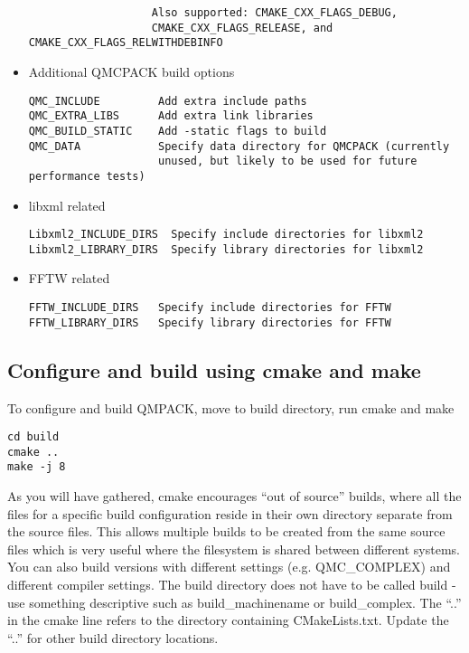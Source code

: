\begin{itemize}
\begin{verbatim}
                   Also supported: CMAKE_CXX_FLAGS_DEBUG,
                   CMAKE_CXX_FLAGS_RELEASE, and CMAKE_CXX_FLAGS_RELWITHDEBINFO
\end{verbatim}
\item Additional QMCPACK build options
\begin{verbatim}
QMC_INCLUDE         Add extra include paths
QMC_EXTRA_LIBS      Add extra link libraries
QMC_BUILD_STATIC    Add -static flags to build
QMC_DATA            Specify data directory for QMCPACK (currently
                    unused, but likely to be used for future performance tests)
\end{verbatim}
\item libxml related
\begin{verbatim}
Libxml2_INCLUDE_DIRS  Specify include directories for libxml2
Libxml2_LIBRARY_DIRS  Specify library directories for libxml2
\end{verbatim}
 \item FFTW related
\begin{verbatim}
FFTW_INCLUDE_DIRS   Specify include directories for FFTW
FFTW_LIBRARY_DIRS   Specify library directories for FFTW
\end{verbatim}
\end{itemize}

\subsection{Configure and build using cmake and make}
To configure and build QMPACK, move to build directory, run cmake and make
\begin{verbatim}
cd build
cmake ..
make -j 8
\end{verbatim}

As you will have gathered, cmake encourages ``out of source'' builds,
where all the files for a specific build configuration reside in their
own directory separate from the source files. This allows multiple
builds to be created from the same source files which is very useful
where the filesystem is shared between different systems. You can also
build versions with different settings (e.g. QMC\_COMPLEX) and
different compiler settings. The build directory does not have to be
called build - use something descriptive such as build\_machinename or
build\_complex. The ``..'' in the cmake line refers to the directory
containing CMakeLists.txt. Update the ``..'' for other build 
directory locations.

